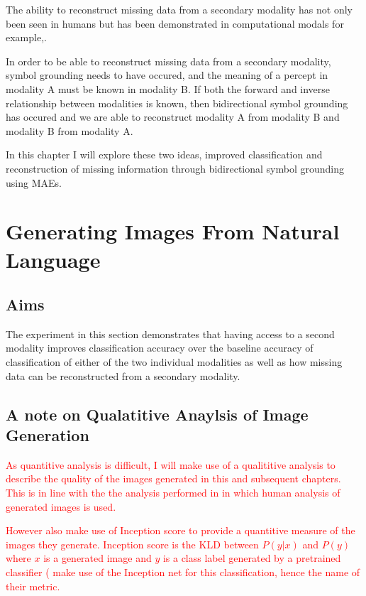 The ability to reconstruct missing data from a secondary modality has not only been seen in humans \cite{ma2009lip, samuel1997lexical} but has been demonstrated in computational modals for example,\cite{ngiam2011multimodal, silberer2014learning}.

In order to be able to reconstruct missing data from a secondary modality, symbol grounding needs to have occured, and the meaning of a percept in modality A must be known in modality B.
If both the forward and inverse relationship between modalities is known, then bidirectional symbol grounding has occured and we are able to reconstruct modality A from modality B and modality B from modality A.

In this chapter I will explore these two ideas, improved classification and reconstruction of missing information through  bidirectional symbol grounding using \acp{MAE}.



\section{Generating Images From Natural Language}
\subsection{Aims}
The experiment in this section demonstrates that having access to a second modality improves classification accuracy over the baseline accuracy of classification of either of the two individual modalities as well as how missing data can be reconstructed from a secondary modality.

\subsection{A note on Qualatitive Anaylsis of Image Generation}
\textcolor{red}{As quantitive analysis is difficult, I will make use of a qualititive analysis to describe the quality of the images generated in this and subsequent chapters.
This is in line with the the analysis performed in \cite{reed2016generative, zhang2017stackgan, xu2018attngan, li2018video, mansimov2015generating} in which human analysis of generated images is used.}

\textcolor{red}{However \cite{zhang2017stackgan, xu2018attngan, li2018video} also make use of Inception score to provide a quantitive measure of the images they generate. Inception score is the \ac{KLD} between $P(y|x)$ and $P(y)$ where $x$ is a generated image and $y$ is a class label generated by a pretrained classifier (\cite{zhang2017stackgan, xu2018attngan, li2018video} make use of the Inception net \cite{szegedy2017inception} for this classification, hence the name of their metric.}

